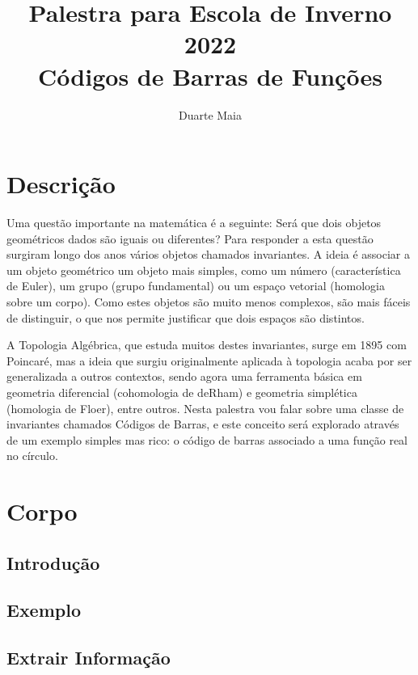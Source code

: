 \documentclass{article}
\title{Palestra para Escola de Inverno 2022\\
Códigos de Barras de Funções}
\author{Duarte Maia}
\theoremstyle{nonumberplain}
\begin{document}
\maketitle

\section{Descrição}

Uma questão importante na matemática é a seguinte: Será que dois objetos geométricos dados são iguais ou diferentes? Para responder a esta questão surgiram longo dos anos vários objetos chamados invariantes. A ideia é associar a um objeto geométrico um objeto mais simples, como um número (característica de Euler), um grupo (grupo fundamental) ou um espaço vetorial (homologia sobre um corpo). Como estes objetos são muito menos complexos, são mais fáceis de distinguir, o que nos permite justificar que dois espaços são distintos.

A Topologia Algébrica, que estuda muitos destes invariantes, surge em 1895 com Poincaré, mas a ideia que surgiu originalmente aplicada à topologia acaba por ser generalizada a outros contextos, sendo agora uma ferramenta básica em geometria diferencial (cohomologia de deRham) e geometria simplética (homologia de Floer), entre outros. Nesta palestra vou falar sobre uma classe de invariantes chamados Códigos de Barras, e este conceito será explorado através de um exemplo simples mas rico: o código de barras associado a uma função real no círculo.

\section{Corpo}

\subsection{Introdução}

\subsection{Exemplo}

\subsection{Extrair Informação}
\end{document}
